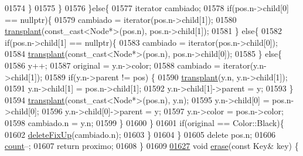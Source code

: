 \begin{DoxyCode}
01574                 \}
01575             \}
01576         \}\textcolor{keywordflow}{else}\{
01577             iterator cambiado;
01578             \textcolor{keywordflow}{if}(pos.n->child[0] == \textcolor{keyword}{nullptr})\{
01579                 cambiado = iterator(pos.n->child[1]);
01580                 \hyperlink{classaed2_1_1map_aa7babdedd4e32da6bf7f8262ccfe8fa6_aa7babdedd4e32da6bf7f8262ccfe8fa6}{transplant}(const\_cast<Node*>(pos.n), pos.n->child[1]);
01581             \} \textcolor{keywordflow}{else}\{
01582                 \textcolor{keywordflow}{if}(pos.n->child[1] == \textcolor{keyword}{nullptr})\{
01583                     cambiado = iterator(pos.n->child[0]);
01584                     \hyperlink{classaed2_1_1map_aa7babdedd4e32da6bf7f8262ccfe8fa6_aa7babdedd4e32da6bf7f8262ccfe8fa6}{transplant}(const\_cast<Node*>(pos.n), pos.n->child[0]);
01585                 \} \textcolor{keywordflow}{else}\{
01586                     y++;
01587                     original = y.n->color;
01588                     cambiado = iterator(y.n->child[1]);
01589                     \textcolor{keywordflow}{if}(y.n->parent != pos) \{
01590                         \hyperlink{classaed2_1_1map_aa7babdedd4e32da6bf7f8262ccfe8fa6_aa7babdedd4e32da6bf7f8262ccfe8fa6}{transplant}(y.n, y.n->child[1]);
01591                         y.n->child[1] = pos.n->child[1];
01592                         y.n->child[1]->parent = y;
01593                     \}
01594                     \hyperlink{classaed2_1_1map_aa7babdedd4e32da6bf7f8262ccfe8fa6_aa7babdedd4e32da6bf7f8262ccfe8fa6}{transplant}(const\_cast<Node*>(pos.n), y.n);
01595                     y.n->child[0] = pos.n->child[0];
01596                     y.n->child[0]->parent = y;
01597                     y.n->color = pos.n->color;
01598                     cambiado.n = y.n;
01599                 \}
01600             \}
01601             \textcolor{keywordflow}{if}(original == Color::Black)\{
01602                 \hyperlink{classaed2_1_1map_af2eed16fe5e8bdbe5a9d979a5d136732_af2eed16fe5e8bdbe5a9d979a5d136732}{deleteFixUp}(cambiado.n);
01603             \}
01604         \}
01605         \textcolor{keyword}{delete} pos.n;
01606         \hyperlink{classaed2_1_1map_a44236c4f16cdc20a10759862b198bde4_a44236c4f16cdc20a10759862b198bde4}{count}--;
01607         \textcolor{keywordflow}{return} proximo;
01608     \}
01609 
\hypertarget{map_8h_source.tex_l01627}{}\hyperlink{classaed2_1_1map_a2ffadb42cd5f0bc7b3752ff159b75334_a2ffadb42cd5f0bc7b3752ff159b75334}{01627}     \textcolor{keywordtype}{void} \hyperlink{classaed2_1_1map_a2ffadb42cd5f0bc7b3752ff159b75334_a2ffadb42cd5f0bc7b3752ff159b75334}{erase}(\textcolor{keyword}{const} Key& key) \{

\end{DoxyCode}
